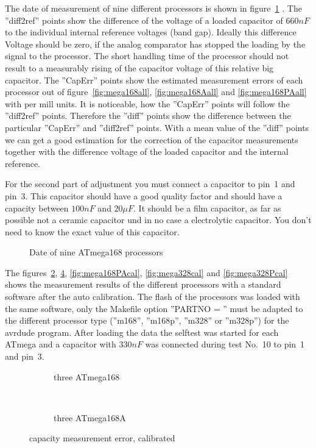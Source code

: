 The date of measurement of nine different processors is shown in figure~\ref{fig:CompAdjust} .
The ''diff2ref'' points show the difference of the voltage of a loaded capacitor of \(660nF\) to the
individual internal reference voltages (band gap).
Ideally this difference Voltage should be zero, if the analog comparator has stopped the loading by the signal to
the processor. The short handling time of the processor should not result to a measurably rising of the 
capacitor voltage of this relative big capacitor.
The ''CapErr'' points show the estimated measurement errors of each processor out of figure~\ref{fig:mega168all}, \ref{fig:mega168Aall} 
and \ref{fig:mega168PAall} with per mill units.
It is noticeable, how the ''CapErr'' points will follow the ''diff2ref'' points.
Therefore the ''diff'' points show the difference between the particular ''CapErr'' and ''diff2ref'' points.
With a mean value of the ''diff'' points we can get a good estimation for the correction of the capacitor
measurements together with the difference voltage of the loaded capacitor and the internal reference.

For the second part of adjustment you must connect a capacitor to pin~1 and pin~3. This capacitor should have
a good quality factor and should have a capacity between \(100nF\) and \(20\mu F\).
It should be a film capacitor, as far as possible not a ceramic capacitor und in no case a electrolytic capacitor.
You don't need to know the exact value of this capacitor.

\begin{figure}[H]
\centering

\caption{Date of nine ATmega168 processors}
\label{fig:CompAdjust}
\end{figure}

The figures~\ref{fig:mega168cal}, \ref{fig:mega168Acal}, \ref{fig:mega168PAcal}, \ref{fig:mega328cal} and \ref{fig:mega328Pcal}
 shows the measurement results
of the different processors with a standard software after the auto calibration.
The flash of the processors was loaded with the same software, only the Makefile  option ''PARTNO = '' must be
adapted to the different processor type (''m168'', ''m168p'', ''m328'' or ''m328p'') for the avrdude program.
After loading the data the selftest was started for each ATmega and a capacitor with \(330nF\) was connected
during test No.~10 to pin~1 and pin~3.

\begin{figure}[H]
  \begin{subfigure}[b]{9cm}
    \centering
    \resizebox{9cm}{!}{}
    \caption{three ATmega168}
    \label{fig:mega168cal}
  \end{subfigure}
  ~
  \begin{subfigure}[b]{9cm}
    \centering
    \resizebox{9cm}{!}{}
    \caption{three ATmega168A}
    \label{fig:mega168Acal}
  \end{subfigure}
  \caption{capacity measurement error, calibrated}
\end{figure}

